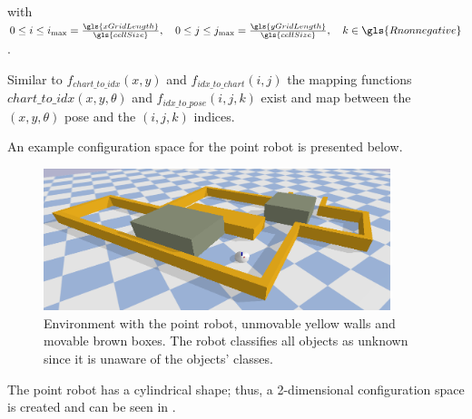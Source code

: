 with $0 \leq i \leq i_{\textrm{max}} = \frac{\gls{xGridLength}}{\gls{cellSize}}, \quad 0 \leq j \leq j_{\textrm{max}} = \frac{\gls{yGridLength}}{\gls{cellSize}}, \quad k \in \gls{Rnonnegative}$.\bs

Similar to $f_\mathit{chart\_to\_idx}(x, y)$ and $f_\mathit{idx\_to\_chart}(i,j)$ the mapping functions $\mathit{chart\_to\_idx}(x, y, \theta)$ and $f_\mathit{idx\_to\_pose}(i, j, k)$ exist and map between the $(x, y, \theta)$ pose and the $(i, j, k)$ indices.\bs

An example configuration space for the point robot is presented below.
\begin{figure}[H]
    \centering
    \includegraphics[width=0.9\textwidth]{figures/required_background/planning/two_push_to_freedom_env}
    \caption{Environment with the point robot, unmovable yellow walls and movable brown boxes. The robot classifies all objects as unknown since it is unaware of the objects' classes.}%
    \label{fig:two_pushes_to_freedom_env}
\end{figure}

The point robot has a cylindrical shape; thus, a 2-dimensional configuration space is created and can be seen in .

